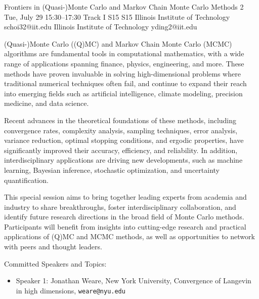 \begin{talk}
\end{talk}

\begin{talk}
  {Frontiers in (Quasi-)Monte Carlo and Markov Chain Monte Carlo Methods}%
  {2}%
  {}%
  {}%
  {}%
  {}%
  {Tue, July 29 15:30–17:30 Track I}%
  {S15}%
  {S15}%
  {%
    {Illinois Institute of Technology}%
    {schoi32@iit.edu}}%
  {%
	{Illinois Institute of Technology}%
	{yding2@iit.edu}}%
  {\organizer{}%
	{}%
	{}}%


(Quasi-)Monte Carlo ((Q)MC) and Markov Chain Monte Carlo (MCMC) algorithms are fundamental tools in computational mathematics, with a wide range of applications spanning finance, physics, engineering, and more. These methods have proven invaluable in solving high-dimensional problems where traditional numerical techniques often fail, and continue to expand their reach into emerging fields such as artificial intelligence, climate modeling, precision medicine, and data science.

Recent advances in the theoretical foundations of these methods, including convergence rates, complexity analysis, sampling techniques, error analysis, variance reduction, optimal stopping conditions, and ergodic properties, have significantly improved their accuracy, efficiency, and reliability. In addition, interdisciplinary applications are driving new developments, such as machine learning, Bayesian inference, stochastic optimization, and uncertainty quantification.

This special session aims to bring together leading experts from academia and industry to share breakthroughs, foster interdisciplinary collaboration, and identify future research directions in the broad field of Monte Carlo methods. Participants will benefit from insights into cutting-edge research and practical applications of (Q)MC and MCMC methods, as well as opportunities to network with peers and thought leaders.


Committed Speakers and Topics:
\begin{itemize}

\item Speaker 1: Jonathan Weare, New York University, Convergence of Langevin in high dimensions, \texttt{weare@nyu.edu}
    

\end{itemize}
\end{talk}
